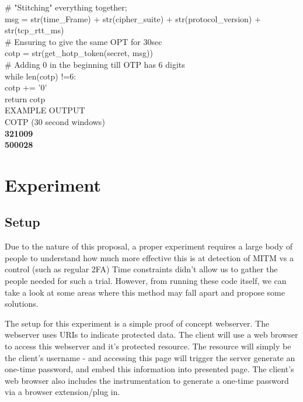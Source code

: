 \documentclass[a4paper, 11pt]{article} 				%
\begin{document}
\# "Stitching" everything together;\\
\indent
msg = str(time\_Frame) + str(cipher\_suite) \indent + str(protocol\_version) + \indent str(tcp\_rtt\_ms)\\

\# Ensuring to give the same OPT for 30sec\\
\indent cotp = str(get\_hotp\_token(secret, msg))\\

\# Adding 0 in the beginning till OTP has 6 digits\\
\indent while len(cotp) !=6:\\
 \indent \indent cotp += '0'\\

\indent \indent return cotp\\

\noindent
EXAMPLE OUTPUT\\
 \noindent
 COTP (30 second windows)\\
 \textbf{321009}\\
 \textbf{500028}\\ 



\section{Experiment}				%
\subsection{Setup}
Due to the nature of this proposal, a proper experiment requires a large body of people to understand how much more effective this is at detection of MITM vs a control (such as regular 2FA) Time constraints didn't allow us to gather the people needed for such a trial. However, from running these code itself, we can take a look at some areas where this method may fall apart and propose some solutions.

The setup for this experiment is a simple proof of concept webserver. The webserver uses URIs to indicate protected data. The client will use a web browser to access this webserver and it's protected resource. The resource will simply be the client's username - and accessing this page will trigger the server generate an one-time password, and embed this information into presented page. The client's web browser also includes the instrumentation to generate a one-time password via a browser extension/plug in. 
\end{document}
